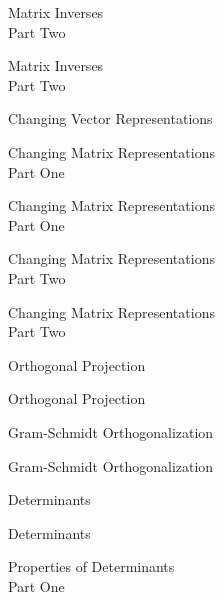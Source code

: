 \documentclass{titlescreen}
\begin{document}
\begin{videotitle}
  Matrix Inverses  \\[1ex]
  Part Two
\end{videotitle}
\begin{videoend}
  Matrix Inverses  \\[1ex]
  Part Two
\end{videoend}


\begin{videotitle}
  Changing Vector Representations
\end{videotitle}
\begin{videoend}
  Changing Matrix Representations \\[1ex]
  Part One
\end{videoend}

\begin{videotitle}
  Changing Matrix Representations \\[1ex]
  Part One
\end{videotitle}
\begin{videoend}
  Changing Matrix Representations \\[1ex]
  Part Two
\end{videoend}

\begin{videotitle}
  Changing Matrix Representations \\[1ex]
  Part Two
\end{videotitle}
\begin{videoend}
  Orthogonal Projection  
\end{videoend}


\begin{videotitle}
  Orthogonal Projection
\end{videotitle}
\begin{videoend}
  Gram-Schmidt Orthogonalization
\end{videoend}

\begin{videotitle}
  Gram-Schmidt Orthogonalization
\end{videotitle}
\begin{videoend}
  Determinants
\end{videoend}





\begin{videotitle}
  Determinants  
\end{videotitle}
\begin{videoend}
  Properties of Determinants \\[1ex]
  Part One
\end{videoend}
\end{document}
